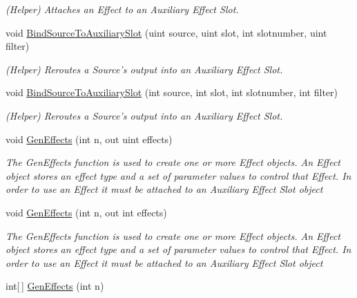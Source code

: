 \begin{DoxyCompactItemize}
\begin{DoxyCompactList}\small\item\em (Helper) Attaches an Effect to an Auxiliary Effect Slot.\end{DoxyCompactList}\item 
void \hyperlink{class_open_t_k_1_1_audio_1_1_open_a_l_1_1_effects_extension_a79643a7458e25042d781e8e31097312e}{Bind\-Source\-To\-Auxiliary\-Slot} (uint source, uint slot, int slotnumber, uint filter)
\begin{DoxyCompactList}\small\item\em (Helper) Reroutes a Source's output into an Auxiliary Effect Slot.\end{DoxyCompactList}\item 
void \hyperlink{class_open_t_k_1_1_audio_1_1_open_a_l_1_1_effects_extension_ad17503fb7238b5867fdd913f31656bc1}{Bind\-Source\-To\-Auxiliary\-Slot} (int source, int slot, int slotnumber, int filter)
\begin{DoxyCompactList}\small\item\em (Helper) Reroutes a Source's output into an Auxiliary Effect Slot.\end{DoxyCompactList}\item 
void \hyperlink{class_open_t_k_1_1_audio_1_1_open_a_l_1_1_effects_extension_a7b17c0ab357339d205be9f83e3840f31}{Gen\-Effects} (int n, out uint effects)
\begin{DoxyCompactList}\small\item\em The Gen\-Effects function is used to create one or more Effect objects. An Effect object stores an effect type and a set of parameter values to control that Effect. In order to use an Effect it must be attached to an Auxiliary Effect Slot object\end{DoxyCompactList}\item 
void \hyperlink{class_open_t_k_1_1_audio_1_1_open_a_l_1_1_effects_extension_aafb8f1e869a412b6bc8607d08f62fa8b}{Gen\-Effects} (int n, out int effects)
\begin{DoxyCompactList}\small\item\em The Gen\-Effects function is used to create one or more Effect objects. An Effect object stores an effect type and a set of parameter values to control that Effect. In order to use an Effect it must be attached to an Auxiliary Effect Slot object\end{DoxyCompactList}\item 
int\mbox{[}$\,$\mbox{]} \hyperlink{class_open_t_k_1_1_audio_1_1_open_a_l_1_1_effects_extension_a746c3add93703b718721d4ecb210c80a}{Gen\-Effects} (int n)

\end{DoxyCompactItemize}
